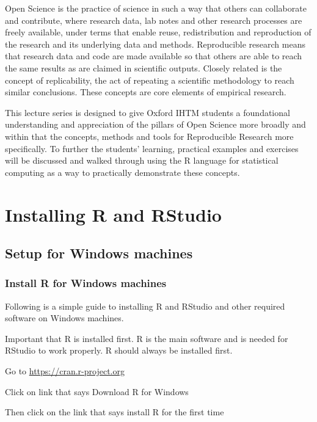 \documentclass[
  12pt,
]{book}
\begin{document}
Open Science is the practice of science in such a way that others can collaborate and contribute, where research data, lab notes and other research processes are freely available, under terms that enable reuse, redistribution and reproduction of the research and its underlying data and methods. Reproducible research means that research data and code are made available so that others are able to reach the same results as are claimed in scientific outputs. Closely related is the concept of replicability, the act of repeating a scientific methodology to reach similar conclusions. These concepts are core elements of empirical research.

This lecture series is designed to give Oxford IHTM students a foundational understanding and appreciation of the pillars of Open Science more broadly and within that the concepts, methods and tools for Reproducible Research more specifically. To further the students' learning, practical examples and exercises will be discussed and walked through using the R language for statistical computing as a way to practically demonstrate these concepts.

\hypertarget{install-r}{%
\chapter{Installing R and RStudio}\label{install-r}}

\hypertarget{setup-for-windows-machines}{%
\section{Setup for Windows machines}\label{setup-for-windows-machines}}

\hypertarget{install-r-for-windows-machines}{%
\subsection{Install R for Windows machines}\label{install-r-for-windows-machines}}

Following is a simple guide to installing R and RStudio and other required software on Windows machines.

Important that R is installed first. R is the main software and is needed for RStudio to work properly. R should always be installed first.

Go to \url{https://cran.r-project.org}

Click on link that says Download R for Windows

Then click on the link that says install R for the first time
\end{document}
